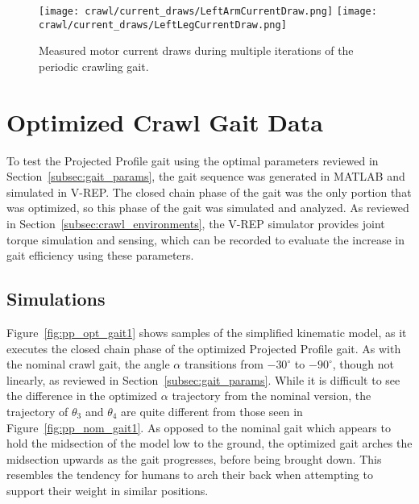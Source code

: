 \begin{figure}
\centering
\texttt{[image: crawl/current\_draws/LeftArmCurrentDraw.png]}
\texttt{[image: crawl/current\_draws/LeftLegCurrentDraw.png]}

\caption{Measured motor current draws during multiple iterations of the periodic crawling gait.}
\label{fig:nao_currents}
\end{figure}




\FloatBarrier
\section{Optimized Crawl Gait Data} \label{sec:opt_crawl_data}

To test the Projected Profile gait using the optimal parameters reviewed in 
Section~\ref{subsec:gait_params}, the gait sequence was generated in
MATLAB and simulated in V-REP\@. The closed chain phase of the gait was the
only portion that was optimized, so this phase of the gait was simulated and
analyzed. As reviewed in Section~\ref{subsec:crawl_environments}, the V-REP simulator
provides joint torque simulation and sensing, which can be recorded to evaluate
the increase in gait efficiency using these parameters.

\subsection{Simulations}

Figure~\ref{fig:pp_opt_gait1} shows samples of the simplified kinematic model,
as it executes the closed chain phase of the optimized Projected Profile gait.
As with the nominal crawl gait, the angle $\alpha$ transitions from $-30^\circ$ to $-90^\circ$,
though not linearly, as reviewed in Section~\ref{subsec:gait_params}.
While it is difficult to see the difference in the optimized $\alpha$ trajectory from the
nominal version, the trajectory of $\theta_3$ and $\theta_4$ are quite different
from those seen in Figure~\ref{fig:pp_nom_gait1}. As opposed to the nominal gait
which appears to hold the midsection of the model low to the ground, the optimized
gait arches the midsection upwards as the gait progresses, before being brought down. This resembles the tendency for humans to arch their back when attempting
to support their weight in similar positions.

